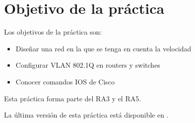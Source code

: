 
\usepackage{eurosym}


\renewcommand{\hmwkClass}{Planificación y Administración de Redes}
\renewcommand{\hmwkTitle}{Práctica VLAN en Cisco}









\primerapagina

\setlength{\parindent}{0em}
\setlength{\parskip}{1em}


\section{Objetivo de la práctica}
Los objetivos de la práctica son:
\begin{itemize}
\item Diseñar una red en la que se tenga en cuenta la velocidad
\item Configurar VLAN 802.1Q en routers y switches
\item Conocer comandos IOS de Cisco
\end{itemize}

Esta práctica forma parte del RA3 y el RA5.

La última versión de esta práctica está disponible en .


